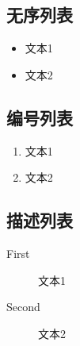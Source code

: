 \subsection{无序列表}

\begin{itemize}
  \item 文本1
  \item 文本2
\end{itemize}

\subsection{编号列表}

\begin{enumerate}
  \item 文本1
  \item 文本2 
\end{enumerate}

\subsection{描述列表}

\begin{description}
  \item[First] 文本1
  \item[Second] 文本2
\end{description}

